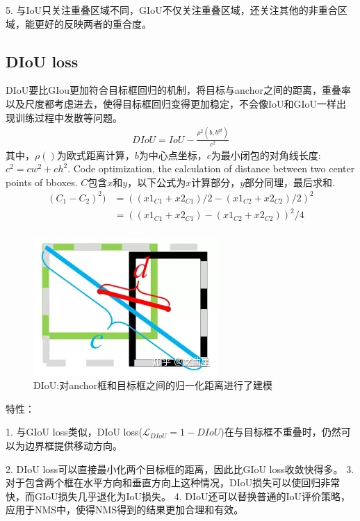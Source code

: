 \documentclass{article}
\begin{document}
5. 与IoU只关注重叠区域不同，GIoU不仅关注重叠区域，还关注其他的非重合区域，能更好的反映两者的重合度。
\subsection{DIoU loss}
DIoU要比GIou更加符合目标框回归的机制，将目标与anchor之间的距离，重叠率以及尺度都考虑进去，使得目标框回归变得更加稳定，不会像IoU和GIoU一样出现训练过程中发散等问题。
\begin{align}
DIoU = IoU - 	\frac{\rho^2(b,b^{gt})}{c^2}
\end{align}
其中，$\rho()$为欧式距离计算，$b$为中心点坐标，$c$为最小闭包的对角线长度:$c^2= cw^2+ch^2$.
Code optimization, the calculation of distance between two center points of bboxes.
$C$包含$x$和$y$，以下公式为$x$计算部分，$y$部分同理，最后求和.
\begin{equation}
\begin{aligned}
(C_1-C_2)^2)&= ((x1_{C1}+x2_{C1})/2-(x1_{C2}+x2_{C2})/2)^2 \\
&=((x1_{C1}+x2_{C1})-(x1_{C2}+x2_{C2}))^2/4 \\
\end{aligned}
\end{equation}
\begin{figure}[htp]
\centering
\includegraphics[scale=0.5]{images/DIoU.jpg}
\caption{DIoU:对anchor框和目标框之间的归一化距离进行了建模}
\label{Fig. DIoU}
\end{figure}
特性：

1. 与GIoU loss类似，DIoU loss($ \mathcal{L}_{DIoU}= 1- DIoU$)在与目标框不重叠时，仍然可以为边界框提供移动方向。

2. DIoU loss可以直接最小化两个目标框的距离，因此比GIoU loss收敛快得多。
3. 对于包含两个框在水平方向和垂直方向上这种情况，DIoU损失可以使回归非常快，而GIoU损失几乎退化为IoU损失。
4. DIoU还可以替换普通的IoU评价策略，应用于NMS中，使得NMS得到的结果更加合理和有效。
\end{document}

